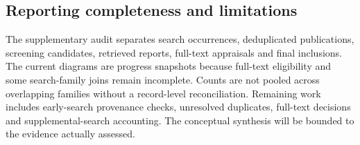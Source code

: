 \subsection{Reporting completeness and limitations}
The supplementary audit separates search occurrences, deduplicated publications, screening candidates, retrieved reports, full-text appraisals and final inclusions. The current diagrams are progress snapshots because full-text eligibility and some search-family joins remain incomplete. Counts are not pooled across overlapping families without a record-level reconciliation. Remaining work includes early-search provenance checks, unresolved duplicates, full-text decisions and supplemental-search accounting. The conceptual synthesis will be bounded to the evidence actually assessed.

